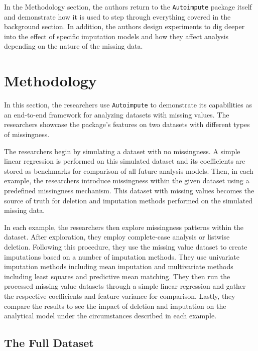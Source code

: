 \documentclass[12pt,oneside]{chicagocapstone}
\begin{document}
In the Methodology section, the authors return to the
\texttt{Autoimpute} package itself and demonstrate how it is used to
step through everything covered in the background section. In addition,
the authors design experiments to dig deeper into the effect of specific
imputation models and how they affect analysis depending on the nature
of the missing data.

\hypertarget{methodology}{\chapter*{Methodology}\label{methodology}}

In this section, the researchers use \texttt{Autoimpute} to demonstrate
its capabilities as an end-to-end framework for analyzing datasets with
missing values. The researchers showcase the package's features on two
datasets with different types of missingness.

The researchers begin by simulating a dataset with no missingness. A
simple linear regression is performed on this simulated dataset and its
coefficients are stored as benchmarks for comparison of all future
analysis models. Then, in each example, the researchers introduce
missingness within the given dataset using a predefined missingness
mechanism. This dataset with missing values becomes the source of truth
for deletion and imputation methods performed on the simulated missing
data.

In each example, the researchers then explore missingness patterns
within the dataset. After exploration, they employ complete-case
analysis or listwise deletion. Following this procedure, they use the
missing value dataset to create imputations based on a number of
imputation methods. They use univariate imputation methods including
mean imputation and multivariate methods including least squares and
predictive mean matching. They then run the processed missing value
datasets through a simple linear regression and gather the respective
coefficients and feature variance for comparison. Lastly, they compare
the results to see the impact of deletion and imputation on the
analytical model under the circumstances described in each example.

\section*{The Full Dataset}\label{the-full-dataset}
\end{document}
